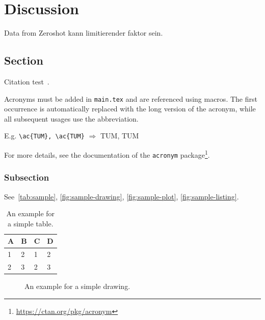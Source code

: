 
\chapter{Discussion}\label{chapter:ciscussion}

Data from Zeroshot kann limitierender faktor sein. 

\section{Section}



Citation test~\parencite{latex}.

Acronyms must be added in \texttt{main.tex} and are referenced using macros. The first occurrence is automatically replaced with the long version of the acronym, while all subsequent usages use the abbreviation.

E.g. \texttt{\textbackslash ac\{TUM\}, \textbackslash ac\{TUM\}} $\Rightarrow$ \ac{TUM}, \ac{TUM}

For more details, see the documentation of the \texttt{acronym} package\footnote{\url{https://ctan.org/pkg/acronym}}.
\subsection{Subsection}

See~\autoref{tab:sample}, \autoref{fig:sample-drawing}, \autoref{fig:sample-plot}, \autoref{fig:sample-listing}.

\begin{table}[htpb]
  \caption[Example table]{An example for a simple table.}\label{tab:sample}
  \centering
  \begin{tabular}{l l l l}
    \toprule
      A & B & C & D \\
    \midrule
      1 & 2 & 1 & 2 \\
      2 & 3 & 2 & 3 \\
    \bottomrule
  \end{tabular}
\end{table}

\begin{figure}[htpb]
  \centering
  \caption[Example drawing]{An example for a simple drawing.}\label{fig:sample-drawing}
\end{figure}


